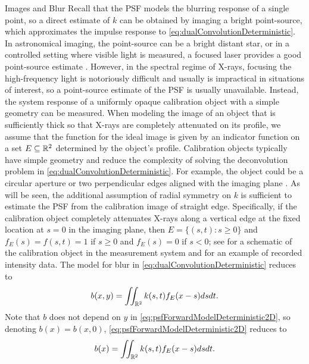 \begin{chapter}{Images and Blur}
  Recall that the PSF models the blurring response of a single point, so a direct estimate of $k$ can be obtained by imaging a bright point-source, which approximates the impulse response to \eqref{eq:dualConvolutionDeterministic}.
  In astronomical imaging, the point-source can be a bright distant star, or in a controlled setting where visible light is measured, a focused laser provides a good point-source estimate \citep{tomaney1996expanding}.
  However, in the spectral regime of X-rays, focusing the high-frequency light is notoriously difficult and usually is impractical in situations of interest, so a point-source estimate of the PSF is usually unavailable. %
  Instead, the system response of a uniformly opaque calibration object with a simple geometry can be measured.
  When modeling the image of an object that is sufficiently thick so that X-rays are completely attenuated on its profile, we assume that the function for the ideal image is given by an indicator function on a set $E \subseteq \mathbb R^2$ determined by the object's profile.
  Calibration objects typically have simple geometry and reduce the complexity of solving the deconvolution problem in \eqref{eq:dualConvolutionDeterministic}.  
  For example, the object could be a circular aperture or two perpendicular edges aligned with the imaging plane \citep{doering1992,watson1993}.
  As will be seen, the additional assumption of radial symmetry on $k$ is sufficient to estimate the PSF from the calibration image of straight edge. 
  Specifically, if the calibration object completely attenuates X-rays along a vertical edge at the fixed location at $s=0$ in the imaging plane, then $E=\{(s,t):s\ge0\}$ and $f_E(s) = f(s,t) = 1$ if $s\ge0$ and $f_E(s)=0$ if $s <0$; see  for a schematic of the calibration object in the measurement system and  for an example of recorded intensity data.
  The model for blur in \eqref{eq:dualConvolutionDeterministic} reduces to
\begin{equation}\label{eq:psfForwardModelDeterministic2D}
  b(x,y) = \iint_{\mathbb R^2} k(s,t) f_E(x-s)dsdt. 
\end{equation}
  Note that $b$ does not depend on $y$ in \eqref{eq:psfForwardModelDeterministic2D}, so denoting $b(x) = b(x,0)$, \eqref{eq:psfForwardModelDeterministic2D} reduces to
\begin{equation}\label{eq:psfForwardModelDeterministic}
  b(x) = \iint_{\mathbb R^2} k(s,t) f_E(x-s)dsdt. 
\end{equation} 
  

\end{chapter}
